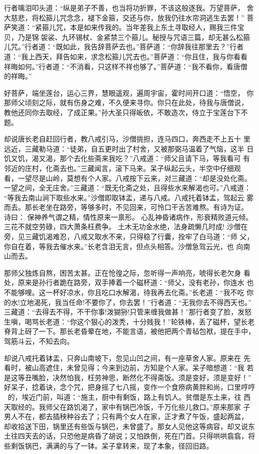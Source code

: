 行者噙泪叩头道：“纵是弟子不善，也当将功折罪，不该这般逐我。万望菩萨，
舍大慈悲，将松箍儿咒念念，褪下金箍，交还与你，放我仍往水帘洞逃生去罢！”
菩萨笑道：“紧箍儿咒，本是如来传我的。当年差我上东土寻取经人，赐我三件宝
贝，乃是锦袈裟、九环锡杖、金紧禁三个箍儿。秘授与咒语三篇，却无甚么松箍
儿咒。”行者道：“既如此，我告辞菩萨去也。”菩萨道：“你辞我往那里去？”行者
道：“我上西天，拜告如来，求念松箍儿咒去也。”菩萨道：“你且住，我与你看看
祥晦如何。”行者道：“不消看，只这样不祥也够了。”菩萨道：“我不看你，看唐僧
的祥晦。”

好菩萨，端坐莲台，运心三界，慧眼遥观，遍周宇宙，霍时间开口道：“悟空，
你那师父顷刻之际，就有伤身之难，不久便来寻你。你只在此处，待我与唐僧说，
教他还同你去取经，了成正果。”孙大圣只得皈依，不敢造次，侍立于宝莲台下不
题。

却说唐长老自赶回行者，教八戒引马，沙僧挑担，连马四口，奔西走不上五十
里远近，三藏勒马道：“徒弟，自五更时出了村舍，又被那弼马温着了气恼，这半
日饥又饥，渴又渴，那个去化些斋来我吃？”八戒道：“师父且请下马，等我看可
有邻近的庄村，化斋去也。”三藏闻言，滚下马来。呆子纵起云头，半空中仔细观
看，一望尽是山岭，莫想有个人家。八戒按下云来，对三藏道：“却是没处化斋。
一望之间，全无庄舍。”三藏道：“既无化斋之处，且得些水来解渴也可。”八戒道：
“等我去南山涧下取些水来。”沙僧即取钵盂，递与八戒。八戒托着钵盂，驾起云
雾而去。那长老坐在路旁，等够多时，不见回来，可怜口干舌苦难熬。有诗为证。
诗曰：
保神养气谓之精，情性原来一禀形。
心乱神昏诸病作，形衰精败道元倾。
三花不就空劳碌，四大萧条枉费争。
土木无功金水绝，法身疏懒几时成!
沙僧在旁，见三藏饥渴难忍，八戒又取水不来，只得稳了行囊，拴牢了白马道：“师
父，你自在着，等我去催水来。”长老含泪无言，但点头相答。沙僧急驾云光，也
向南山而去。

那师父独炼自熬，困苦太甚。正在怆徨之际，忽听得一声响亮，唬得长老欠身
看处，原来是孙行者跪在路旁，双手捧着一个磁杯道：“师父，没有老孙，你连水
也不能够哩。这一杯好凉水，你且吃口水解渴，待我再去化斋。”长老道：“我不吃
你的水!立地渴死，我当任命!不要你了，你去罢！”行者道：“无我你去不得西天也。”
三藏道：“去得去不得，不干你事!泼猢狲!只管来缠我做甚！”那行者变了脸，发怒
生嗔，喝骂长老道：“你这个狠心的泼秃，十分贱我！”轮铁棒，丢了磁杯，望长老
脊背上砑了一下。那长老昏晕在地，不能言语，被他把两个青毡包袱，提在手中，
驾筋斗云，不知去向。

却说八戒托着钵盂，只奔山南坡下，忽见山凹之间，有一座草舍人家。原来在
先看时，被山高遮住，未曾见得；今来到边前，方知是个人家。呆子暗想道：“我
若是这等丑嘴脸，决然怕我，枉劳神思，断然化不得斋饭。须是变好，须是变好！”
好呆子，捻着诀，念个咒，把身摇了七八摇，变作一个食痨病黄胖和尚，口里哼哼
的，埃近门前，叫道：“施主，厨中有剩饭，路上有饥人。贫僧是东土来，往
西天取经的。我师父在路饥渴了，家中有锅巴冷饭，千万化些儿救口。”原来那家
子男人不在，都去插秧种谷去了；只有两个女人在家，正才煮了午饭，盛起两盆，
却收拾送下田，锅里还有些饭与锅巴，未曾盛了。那女人见他这等病容，却又说东
土往四天去的话，只恐他是病昏了胡说；又怕跌倒，死在门首。只得哄哄翕翕，将
些剩饭锅巴，满满的与了一钵。呆子拿转来，现了本象，径回旧路。

